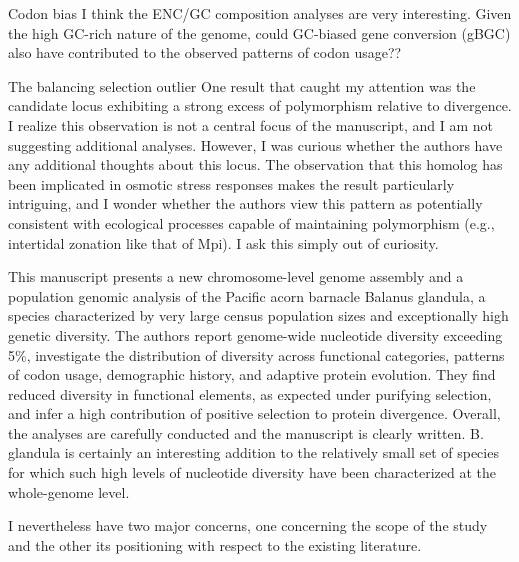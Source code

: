 
\begin{point}{Codon bias}
I think the ENC/GC composition analyses are very interesting. Given the
high GC-rich nature of the genome, could GC-biased gene conversion (gBGC)
also have contributed to the observed patterns of codon usage??
\end{point}


\begin{point}{The balancing selection outlier}
One result that caught my attention was the candidate locus exhibiting a
strong excess of polymorphism relative to divergence. I realize this
observation is not a central focus of the manuscript, and I am not
suggesting additional analyses. However, I was curious whether the
authors have any additional thoughts about this locus. The observation
that this homolog has been implicated in osmotic stress responses makes
the result particularly intriguing, and I wonder whether the authors view
this pattern as potentially consistent with ecological processes capable
of maintaining polymorphism (e.g., intertidal zonation like that of Mpi).
I ask this simply out of curiosity.
\end{point}




\begin{itquote}
This manuscript presents a new chromosome-level genome assembly and a
population genomic analysis of the Pacific acorn barnacle Balanus
glandula, a species characterized by very large census population sizes
and exceptionally high genetic diversity. The authors report genome-wide
nucleotide diversity exceeding 5\%, investigate the distribution of
diversity across functional categories, patterns of codon usage,
demographic history, and adaptive protein evolution. They find reduced
diversity in functional elements, as expected under purifying selection,
and infer a high contribution of positive selection to protein
divergence. Overall, the analyses are carefully conducted and the
manuscript is clearly written. B. glandula is certainly an interesting
addition to the relatively small set of species for which such high
levels of nucleotide diversity have been characterized at the
whole-genome level.

I nevertheless have two major concerns, one concerning the scope of the
study and the other its positioning with respect to the existing
literature.
\end{itquote}

